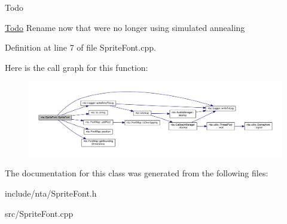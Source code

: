 \begin{DoxyRefDesc}{Todo}
\item[\hyperlink{todo__todo000008}{Todo}]Rename now that we\textquotesingle{}re no longer using simulated annealing \end{DoxyRefDesc}


Definition at line 7 of file Sprite\+Font.\+cpp.

Here is the call graph for this function\+:\nopagebreak
\begin{figure}[H]
\begin{center}
\leavevmode
\includegraphics[width=350pt]{d6/d57/classnta_1_1SpriteFont_a9dc96f31efd0830dcb476ea87534e358_cgraph}
\end{center}
\end{figure}


The documentation for this class was generated from the following files\+:\begin{DoxyCompactItemize}
\item 
include/nta/Sprite\+Font.\+h\item 
src/Sprite\+Font.\+cpp\end{DoxyCompactItemize}
